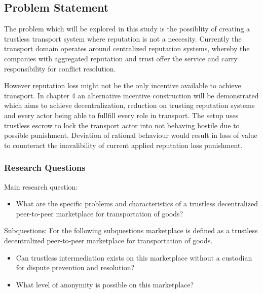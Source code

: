 \documentclass[Nomencl]{DylanMaster}
\begin{document}
\subsection{Problem Statement}

The problem which will be explored in this study is the possiblity of creating a trustless transport system where reputation is not a neccesity. Currently the transport domain operates around centralized reputation systems, whereby the companies with aggregated reputation and trust offer the service and carry responsibility for conflict resolution.\par
However reputation loss might not be the only incentive available to achieve transport. In chapter 4 an alternative incentive construction will be demonstrated which aims to achieve decentralization, reduction on trusting reputation systems and every actor being able to fullfill every role in transport. The setup uses trustless escrow to lock the transport actor into not behaving hostile due to possible punishment. Deviation of rational behaviour would result in loss of value to counteract the inavalibility of current applied reputation loss punishment.

\subsubsection{Research Questions}

\bigbreak
\noindent Main research question:
\begin{itemize}
  \item What are the specific problems and characteristics of a trustless decentralized peer-to-peer marketplace for transportation of goods?
\end{itemize}
\bigbreak
\noindent Subquestions:
\bigbreak
\noindent For the following subquestions marketplace is defined as a trustless decentralized peer-to-peer marketplace for transportation of goods.
\begin{itemize}
  \item Can trustless intermediation exists on this marketplace without a custodian for dispute prevention and resolution?
  \item What level of anonymity is possible on this marketplace?
\end{itemize}
\end{document}
